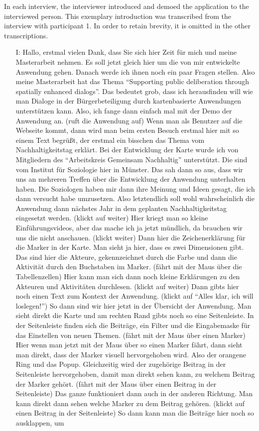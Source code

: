 \label{demo}
In each interview, the interviewer introduced and demoed the application to the interviewed person. This exemplary introduction was transcribed from the interview with participant 1. In order to retain brevity, it is omitted in the other transcriptions.

\begin{itemize}
\item[I:] Hallo, erstmal vielen Dank, dass Sie sich hier Zeit f{\"u}r mich und meine Masterarbeit nehmen. Es soll jetzt gleich hier um die von mir entwickelte Anwendung gehen. Danach werde ich ihnen noch ein paar Fragen stellen. Also meine Masterarbeit hat das Thema "`Supporting public deliberation through spatially enhanced dialogs"'. Das bedeutet grob, dass ich herausfinden will wie man Dialoge in der B{\"u}rgerbeteiligung durch kartenbasierte Anwendungen unterst{\"u}tzen kann. Also, ich fange dann einfach mal mit der Demo der Anwendung an. (ruft die Anwendung auf) Wenn man als Benutzer auf die Webseite kommt, dann wird man beim ersten Besuch erstmal hier mit so einem Text begr{\"u}{\ss}t, der erstmal ein bisschen das Thema vom Nachhaltigkeitstag erkl{\"a}rt. Bei der Entwicklung der Karte wurde ich von Mitgliedern des "`Arbeitskreis Gemeinsam Nachhaltig"' unterst{\"u}tzt. Die sind vom Institut f{\"u}r Soziologie hier in M{\"u}nster. Das sah dann so aus, dass wir uns an mehreren Treffen {\"u}ber die Entwicklung der Anwendung unterhalten haben. Die Soziologen haben mir dann ihre Meinung und Ideen gesagt, die ich dann versucht habe umzusetzen. Also letztendlich soll wohl wahrscheinlich die Anwendung dann n{\"a}chstes Jahr in dem geplanten Nachhaltigkeitstag eingesetzt werden. (klickt auf weiter) Hier kriegt man so kleine Einf{\"u}hrungsvideos, aber das mache ich ja jetzt m{\"u}ndlich, da brauchen wir uns die nicht anschauen. (klickt weiter) Dann hier die Zeichenerkl{\"a}rung f{\"u}r die Marker in der Karte. Man sieht ja hier, dass es zwei Dimensionen gibt. Das sind hier die Akteure, gekennzeichnet durch die Farbe und dann die Aktivit{\"a}t durch den Buchstaben im Marker. (f{\"a}hrt mit der Maus {\"u}ber die Tabellenzellen) Hier kann man sich dann noch kleine Erkl{\"a}rungen zu den Akteuren und Aktivit{\"a}ten durchlesen. (klickt auf weiter) Dann gibts hier noch einen Text zum Kontext der Anwendung. (klickt auf "`Alles klar, ich will loslegen!"') So dann sind wir hier jetzt in der {\"U}bersicht der Anwendung. Man sieht direkt die Karte und am rechten Rand gibts noch so eine Seitenleiste. In der Seitenleiste finden sich die Beitr{\"a}ge, ein Filter und die Eingabemaske f{\"u}r das Einstellen von neuen Themen. (f{\"a}hrt mit der Maus {\"u}ber einen Marker) Hier wenn man jetzt mit der Maus {\"u}ber so einen Marker f{\"a}hrt, dann sieht man direkt, dass der Marker visuell hervorgehoben wird. Also der orangene Ring und das Popup. Gleichzeitig wird der zugeh{\"o}rige Beitrag in der Seitenleiste hervorgehoben, damit man direkt sehen kann, zu welchem Beitrag der Marker geh{\"o}rt. (f{\"a}hrt mit der Maus {\"u}ber einen Beitrag in der Seitenleiste) Das ganze funktioniert dann auch in der anderen Richtung. Man kann direkt dann sehen welche Marker zu dem Beitrag geh{\"o}ren. (klickt auf einen Beitrag in der Seitenleiste) So dann kann man die Beitr{\"a}ge hier noch so ausklappen, um 
\end{itemize}
